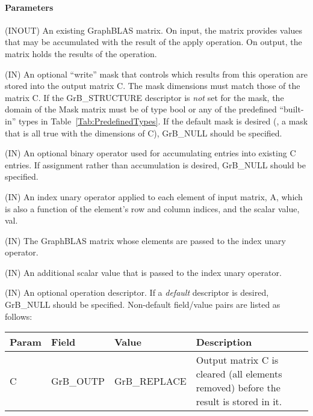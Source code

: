 \paragraph{Parameters}

\begin{itemize}[leftmargin=1.1in]
    \item[{\sf C}]    ({\sf INOUT}) An existing GraphBLAS matrix. On input,
    the matrix provides values that may be accumulated with the result of the
    apply operation.  On output, the matrix holds the results of the
    operation.

    \item[{\sf Mask}] ({\sf IN}) An optional ``write'' mask that controls which
    results from this operation are stored into the output matrix {\sf C}. The 
    mask dimensions must match those of the matrix {\sf C}. If the 
    {\sf GrB\_STRUCTURE} descriptor is {\em not} set for the mask, the domain of the 
    {\sf Mask} matrix must be of type {\sf bool} or any of the predefined 
    ``built-in'' types in Table~\ref{Tab:PredefinedTypes}.  If the default
    mask is desired (\ie, a mask that is all {\sf true} with the dimensions of {\sf C}), 
    {\sf GrB\_NULL} should be specified.

    \item[{\sf accum}] ({\sf IN}) An optional binary operator used for accumulating
    entries into existing {\sf C} entries. If assignment rather than accumulation is
    desired, {\sf GrB\_NULL} should be specified.

{\color{red}
    \item[{\sf op}] ({\sf IN}) An index unary operator applied to each element of input 
    matrix, {\sf A}, which is also a function of the element's row and column indices,
    and the scalar value, {\sf val}.
}
    \item[{\sf A}] ({\sf IN}) The GraphBLAS matrix whose elements are passed 
    to the index unary operator.

    \item[{\sf val}] ({\sf IN}) An additional scalar value that is passed to the 
    index unary operator.

    \item[{\sf desc}] ({\sf IN}) An optional operation descriptor. If
    a \emph{default} descriptor is desired, {\sf GrB\_NULL} should be
    specified. Non-default field/value pairs are listed as follows:  \\

    \hspace*{-2em}\begin{tabular}{lllp{2.7in}}
        Param & Field  & Value & Description \\
        \hline
        {\sf C}    & {\sf GrB\_OUTP} & {\sf GrB\_REPLACE} & Output matrix {\sf C}
        is cleared (all elements removed) before the result is stored in it.\\


\end{tabular}
\end{itemize}
